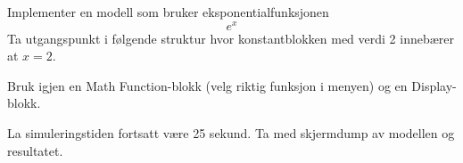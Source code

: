 
\item[n)]
  Implementer en modell som bruker eksponentialfunksjonen 
   \begin{equation}
     e^{x} 
   \end{equation}
   Ta utgangspunkt i følgende struktur hvor konstantblokken med verdi
   2 innebærer at  $x=2$.

     \begin{figure}[H]
    \centering
    \hspace*{0mm}
  \end{figure}
   Bruk igjen 
   en {\sf  Math  Function}-blokk (velg riktig funksjon i menyen)
   og en {\sf    Display}-blokk.

{\color{red}La simuleringstiden fortsatt være  25 sekund.}
Ta med skjermdump av modellen og resultatet.

   
